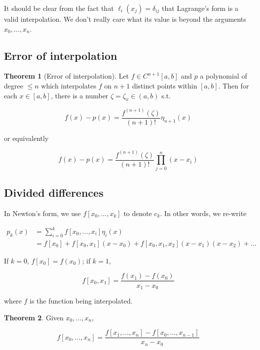 \documentclass[12pt]{article}
\theoremstyle{definition}
\newtheorem{theorem}{Theorem}
\begin{document}
It should be clear from the fact that $\ell_i(x_j) = \delta_{ij}$ that
Lagrange's form is a valid interpolation. We don't really care what its value is
beyond the arguments $x_0, \ldots, x_n$.

\subsection{Error of interpolation}

\begin{theorem}[Error of interpolation]
    Let $f \in C^{n+1}[a, b]$ and $p$ a polynomial of degree $\leq n$ which
    interpolates $f$ on $n+1$ distinct points within $[a, b]$. Then for each 
    $x \in [a, b]$, there is a number $\zeta = \zeta_x \in (a, b)$ s.t. 

    \begin{equation*}
        f(x) - p(x) = \frac{f^{(n+1)}(\zeta)}{(n+1)!}\eta_{n+1}(x)
    \end{equation*}

    or equivalently

    \begin{equation*}
        f(x) - p(x) = \frac{f^{(n+1)}(\zeta)}{(n+1)!}\prod_{j=0}^n(x-x_i)
    \end{equation*}
\end{theorem}

\subsection{Divided differences}

In Newton's form, we use $f[x_0, \ldots, x_k]$ to denote $c_k$. In other words,
we re-write 

\begin{align*}
    p_k(x) 
    &= \sum_{i=0}^k f[x_0, \ldots, x_i] \eta_i(x) \\
    &= f[x_0] + f[x_0, x_1](x
    - x_0) + f[x_0, x_1, x_2](x-x_1)(x-x_2) + \ldots 
\end{align*}

If $k = 0$, $f[x_0] = f(x_0)$; if $k = 1$, 

\begin{equation*}
    f[x_0, x_1] = \frac{f(x_1)-f(x_0)}{x_1 - x_0}
\end{equation*}

where $f$ is the function being interpolated. 

\begin{theorem}
    Given $x_0, \ldots, x_n$, 

    \begin{equation*}
        f[x_0,\ldots, x_n] = \frac{f[x_1, \ldots, x_n] - f[x_0, \ldots,
        x_{n-1}]}{x_n - x_0}
    \end{equation*}
\end{theorem}
\end{document}
